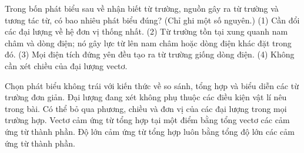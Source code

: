 \begin{ex}
Trong bốn phát biểu sau về nhận biết từ trường, nguồn gây ra từ trường và tương tác từ, có bao nhiêu phát biểu đúng? (Chỉ ghi một số nguyên.) (1) Cần đổi các đại lượng về hệ đơn vị thống nhất. (2) Từ trường tồn tại xung quanh nam châm và dòng điện; nó gây lực từ lên nam châm hoặc dòng điện khác đặt trong đó. (3) Mọi điện tích đứng yên đều tạo ra từ trường giống dòng điện. (4) Không cần xét chiều của đại lượng vectơ.
\end{ex}

\begin{ex}
Chọn phát biểu không trái với kiến thức về so sánh, tổng hợp và biểu diễn các từ trường đơn giản.
\choice
{Đại lượng đang xét không phụ thuộc các điều kiện vật lí nêu trong bài.}
{Có thể bỏ qua phương, chiều và đơn vị của các đại lượng trong mọi trường hợp.}
{\True Vectơ cảm ứng từ tổng hợp tại một điểm bằng tổng vectơ các cảm ứng từ thành phần.}
{Độ lớn cảm ứng từ tổng hợp luôn bằng tổng độ lớn các cảm ứng từ thành phần.}
\end{ex}

